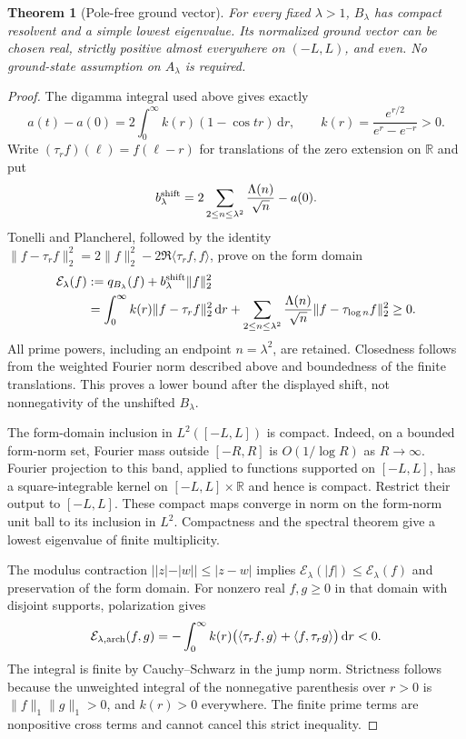 \documentclass[11pt]{article}
\newtheorem{theorem}{Theorem}
\theoremstyle{remark}\newtheorem{remark}[theorem]{Remark}
\newcommand{\R}{\mathbb R}
\newcommand{\dd}{\,\mathrm d}
\begin{document}
\begin{theorem}[Pole-free ground vector]\label{thm:pole-free}
For every fixed $\lambda>1$, $B_\lambda$ has compact resolvent
and a simple lowest eigenvalue. Its normalized ground vector
can be chosen real, strictly positive almost everywhere on
$(-L,L)$, and even. No ground-state assumption on $A_\lambda$
is required.
\end{theorem}
\begin{proof}
The digamma integral used above gives exactly
\[
 a(t)-a(0)=2\int_0^\infty k(r)(1-\cos tr)\dd r,
 \qquad k(r)=\frac{e^{r/2}}{e^r-e^{-r}}>0.
\]
Write $(\tau_r f)(\ell)=f(\ell-r)$ for translations of the
zero extension on $\R$ and put
\[
 b_\lambda^{\rm shift}
   =2\sum_{2\le n\le\lambda^2}\frac{\Lambda(n)}{\sqrt n}-a(0).
\]
Tonelli and Plancherel, followed by the identity
$\|f-\tau_r f\|_2^2=2\|f\|_2^2
-2\Re\langle\tau_r f,f\rangle$, prove on the form domain
\begin{align*}
 \mathcal E_\lambda(f)
 &:=q_{B_\lambda}(f)+b_\lambda^{\rm shift}\|f\|_2^2\\
 &=\int_0^\infty k(r)\|f-\tau_r f\|_2^2\dd r
   +\sum_{2\le n\le\lambda^2}
      \frac{\Lambda(n)}{\sqrt n}
                      \|f-\tau_{\log n}f\|_2^2\ge0.
\end{align*}
All prime powers, including an endpoint $n=\lambda^2$,
are retained. Closedness follows from the weighted Fourier
norm described above and boundedness of the finite translations.
This proves a lower bound after the displayed shift, not
nonnegativity of the unshifted $B_\lambda$.

The form-domain inclusion in $L^2([-L,L])$ is compact. Indeed, on a
bounded form-norm set, Fourier mass outside $[-R,R]$ is
$O(1/\log R)$ as $R\to\infty$. Fourier projection to this
band, applied to functions supported on $[-L,L]$, has a
square-integrable kernel on $[-L,L]\times\R$ and hence is
compact. Restrict their output to $[-L,L]$. These compact maps
converge in norm on the form-norm
unit ball to its inclusion in $L^2$. Compactness and the
spectral theorem give a lowest eigenvalue of finite multiplicity.

The modulus contraction
$||z|-|w||\le|z-w|$ implies
$\mathcal E_\lambda(|f|)\le\mathcal E_\lambda(f)$ and
preservation of the form domain. For nonzero real
$f,g\ge0$ in that domain with disjoint supports, polarization gives
\[
 \mathcal E_{\lambda,{\rm arch}}(f,g)
 =-\int_0^\infty k(r)
       \bigl(\langle\tau_r f,g\rangle
                  +\langle f,\tau_r g\rangle\bigr)\dd r<0.
\]
The integral is finite by Cauchy--Schwarz in the jump norm.
Strictness follows because the unweighted integral of the
nonnegative parenthesis over $r>0$ is
$\|f\|_1\|g\|_1>0$, and $k(r)>0$ everywhere.
The finite prime terms are nonpositive cross terms and cannot
cancel this strict inequality.


\end{proof}
\end{document}
